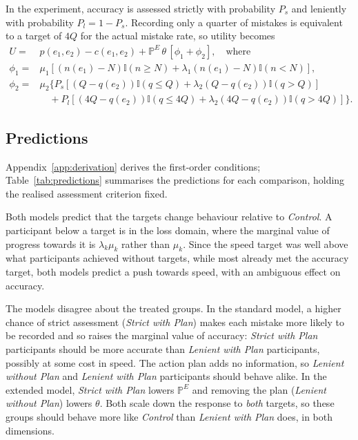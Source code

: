 \documentclass[12pt, letterpaper]{article}
\newcommand{\CtrlName}{Control}
\newcommand{\LPName}{Lenient with Plan}
\newcommand{\SPName}{Strict with Plan}
\newcommand{\LNName}{Lenient without Plan}
\newcommand{\Ctrl}{\textit{\CtrlName}}
\newcommand{\LP}{\textit{\LPName}}
\newcommand{\SP}{\textit{\SPName}}
\newcommand{\LN}{\textit{\LNName}}
\begin{document}
In the experiment, accuracy is assessed strictly with probability $P_s$ and leniently with probability $P_l = 1 - P_s$. Recording only a quarter of mistakes is equivalent to a target of $4Q$ for the actual mistake rate, so utility becomes
\[
\begin{aligned}
U = {} & p(e_1, e_2) - c(e_1, e_2) + \mathbb{P}^E \, \theta \, [\phi_1 + \phi_2], \quad \text{where} \\
\phi_1 = {} & \mu_1[(n(e_1)-N)\mathbb{I}(n \geq N) + \lambda_1(n(e_1)-N)\mathbb{I}(n<N)], \\
\phi_2 = {} & \mu_2 \bigl\{P_s[(Q-q(e_2))\mathbb{I}(q \leq Q) + \lambda_2(Q-q(e_2))\mathbb{I}(q>Q)] \\
& \quad + P_l[(4Q-q(e_2))\mathbb{I}(q \leq 4Q) + \lambda_2(4Q-q(e_2))\mathbb{I}(q>4Q)]\bigr\}.
\end{aligned}
\]

\subsection{Predictions}

Appendix~\ref{app:derivation} derives the first-order conditions; Table~\ref{tab:predictions} summarises the predictions for each comparison, holding the realised assessment criterion fixed.

Both models predict that the targets change behaviour relative to \Ctrl{}. A participant below a target is in the loss domain, where the marginal value of progress towards it is $\lambda_k \mu_k$ rather than $\mu_k$. Since the speed target was well above what participants achieved without targets, while most already met the accuracy target, both models predict a push towards speed, with an ambiguous effect on accuracy.

The models disagree about the treated groups. In the standard model, a higher chance of strict assessment (\SP{}) makes each mistake more likely to be recorded and so raises the marginal value of accuracy: \SP{} participants should be more accurate than \LP{} participants, possibly at some cost in speed. The action plan adds no information, so \LN{} and \LP{} participants should behave alike. In the extended model, \SP{} lowers $\mathbb{P}^E$ and removing the plan (\LN{}) lowers $\theta$. Both scale down the response to \emph{both} targets, so these groups should behave more like \Ctrl{} than \LP{} does, in both dimensions.
\end{document}
